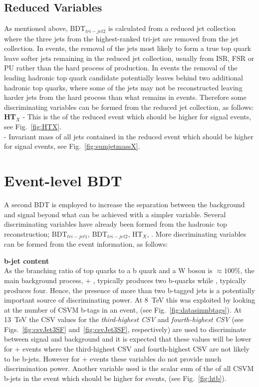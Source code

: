 \subsection{Reduced Variables}
As mentioned above, BDT$_{tri-jet2}$ is calculated from a reduced jet collection where the three jets from the highest-ranked tri-jet are removed from the jet collection. In \ttbar events, the removal of the jets most likely to form a true top quark leave softer jets remaining in the reduced jet collection, usually from ISR, FSR or PU rather than the hard process of \ttbar production. In \tttt events the removal of the leading hadronic top quark candidate potentially leaves behind two additional hadronic top quarks, where some of the jets may not be reconstructed leaving harder jets from the hard process than what remains in \ttbar events. Therefore some discriminating variables can be formed from the reduced jet collection, as follows:
\textbf{HT$_{X}$} - This is the \HT of the reduced event which should be higher for signal \tttt events, see Fig.~\ref{fig:HTX}.\\
\textbf{\sumjetmassX} - Invariant mass of all jets contained in the reduced event which should be higher for signal \tttt events, see Fig.~\ref{fig:sumjetmassX}.

\section{Event-level BDT}

A second BDT is employed to increase the separation between the \ttbar background and \tttt signal beyond what can be achieved with a simpler variable. Several discriminating variables have already been formed from the hadronic top reconstruction; BDT$_{tri-jet1}$, BDT$_{tri-jet2}$, HT$_{X}$, \sumjetmassX. More discriminating variables can be formed from the event information, as follows:

\textbf{b-jet content}\\
As the branching ratio of top quarks to a b quark and a W boson is $\approx 100\%$, the main background process, \ttbar + \llbar, typically produces two b-quarks while \tttt, typically produces four. Hence, the presence of more than two b-tagged jets is a potentially important source of discriminating power.
At 8~TeV this was exploited by looking at the number of CSVM b-tags in an event, \nMtags (see Fig.~\ref{fig:datasimnbtags}). At 13~TeV the CSV values for the \emph{third-highest CSV} and \emph{fourth-highest CSV} (see Figs.~\ref{fig:csvJet3SF} and~\ref{fig:csvJet3SF}, respectively) are used to discriminate between signal and background and it is expected that these values will be lower for \ttbar + \llbar events where the third-highest CSV and fourth-highest CSV are not likely to be b-jets. However for \ttbar + \bbbar events these variables do not provide much discrimination power.
Another variable used is the scalar sum of the \HT of all CSVM b-jets in the event which should be higher for \tttt events, \htb (see Fig.~\ref{fig:htb}).

